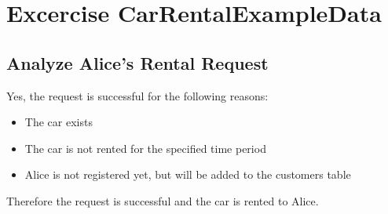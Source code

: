 \section{Excercise CarRentalExampleData}
\subsection*{Analyze Alice's Rental Request}
Yes, the request is successful for the following reasons:
\begin{itemize}
    \item The car exists
    \item The car is not rented for the specified time period
    \item Alice is not registered yet, but will be added to the customers table
\end{itemize}
Therefore the request is successful and the car is rented to Alice.
